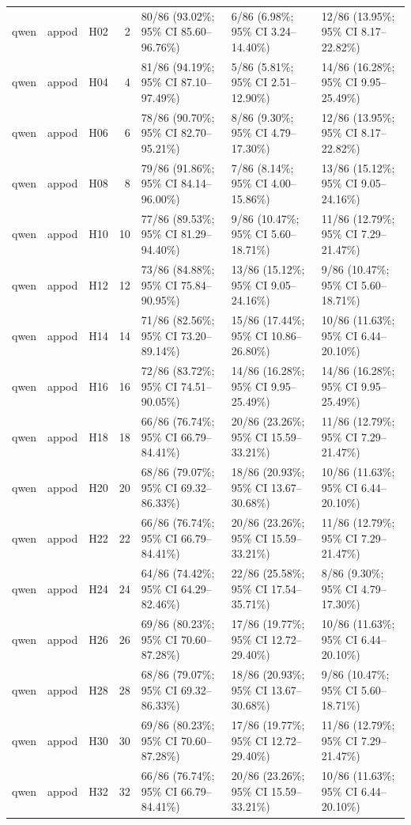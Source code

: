 \begin{longtable}{lllrlll}
qwen & appod & H02 & 2 & 80/86 (93.02\%; 95\% CI 85.60–96.76\%) & 6/86 (6.98\%; 95\% CI 3.24–14.40\%) & 12/86 (13.95\%; 95\% CI 8.17–22.82\%) \\
qwen & appod & H04 & 4 & 81/86 (94.19\%; 95\% CI 87.10–97.49\%) & 5/86 (5.81\%; 95\% CI 2.51–12.90\%) & 14/86 (16.28\%; 95\% CI 9.95–25.49\%) \\
qwen & appod & H06 & 6 & 78/86 (90.70\%; 95\% CI 82.70–95.21\%) & 8/86 (9.30\%; 95\% CI 4.79–17.30\%) & 12/86 (13.95\%; 95\% CI 8.17–22.82\%) \\
qwen & appod & H08 & 8 & 79/86 (91.86\%; 95\% CI 84.14–96.00\%) & 7/86 (8.14\%; 95\% CI 4.00–15.86\%) & 13/86 (15.12\%; 95\% CI 9.05–24.16\%) \\
qwen & appod & H10 & 10 & 77/86 (89.53\%; 95\% CI 81.29–94.40\%) & 9/86 (10.47\%; 95\% CI 5.60–18.71\%) & 11/86 (12.79\%; 95\% CI 7.29–21.47\%) \\
qwen & appod & H12 & 12 & 73/86 (84.88\%; 95\% CI 75.84–90.95\%) & 13/86 (15.12\%; 95\% CI 9.05–24.16\%) & 9/86 (10.47\%; 95\% CI 5.60–18.71\%) \\
qwen & appod & H14 & 14 & 71/86 (82.56\%; 95\% CI 73.20–89.14\%) & 15/86 (17.44\%; 95\% CI 10.86–26.80\%) & 10/86 (11.63\%; 95\% CI 6.44–20.10\%) \\
qwen & appod & H16 & 16 & 72/86 (83.72\%; 95\% CI 74.51–90.05\%) & 14/86 (16.28\%; 95\% CI 9.95–25.49\%) & 14/86 (16.28\%; 95\% CI 9.95–25.49\%) \\
qwen & appod & H18 & 18 & 66/86 (76.74\%; 95\% CI 66.79–84.41\%) & 20/86 (23.26\%; 95\% CI 15.59–33.21\%) & 11/86 (12.79\%; 95\% CI 7.29–21.47\%) \\
qwen & appod & H20 & 20 & 68/86 (79.07\%; 95\% CI 69.32–86.33\%) & 18/86 (20.93\%; 95\% CI 13.67–30.68\%) & 10/86 (11.63\%; 95\% CI 6.44–20.10\%) \\
qwen & appod & H22 & 22 & 66/86 (76.74\%; 95\% CI 66.79–84.41\%) & 20/86 (23.26\%; 95\% CI 15.59–33.21\%) & 11/86 (12.79\%; 95\% CI 7.29–21.47\%) \\
qwen & appod & H24 & 24 & 64/86 (74.42\%; 95\% CI 64.29–82.46\%) & 22/86 (25.58\%; 95\% CI 17.54–35.71\%) & 8/86 (9.30\%; 95\% CI 4.79–17.30\%) \\
qwen & appod & H26 & 26 & 69/86 (80.23\%; 95\% CI 70.60–87.28\%) & 17/86 (19.77\%; 95\% CI 12.72–29.40\%) & 10/86 (11.63\%; 95\% CI 6.44–20.10\%) \\
qwen & appod & H28 & 28 & 68/86 (79.07\%; 95\% CI 69.32–86.33\%) & 18/86 (20.93\%; 95\% CI 13.67–30.68\%) & 9/86 (10.47\%; 95\% CI 5.60–18.71\%) \\
qwen & appod & H30 & 30 & 69/86 (80.23\%; 95\% CI 70.60–87.28\%) & 17/86 (19.77\%; 95\% CI 12.72–29.40\%) & 11/86 (12.79\%; 95\% CI 7.29–21.47\%) \\
qwen & appod & H32 & 32 & 66/86 (76.74\%; 95\% CI 66.79–84.41\%) & 20/86 (23.26\%; 95\% CI 15.59–33.21\%) & 10/86 (11.63\%; 95\% CI 6.44–20.10\%) \\
\end{longtable}
